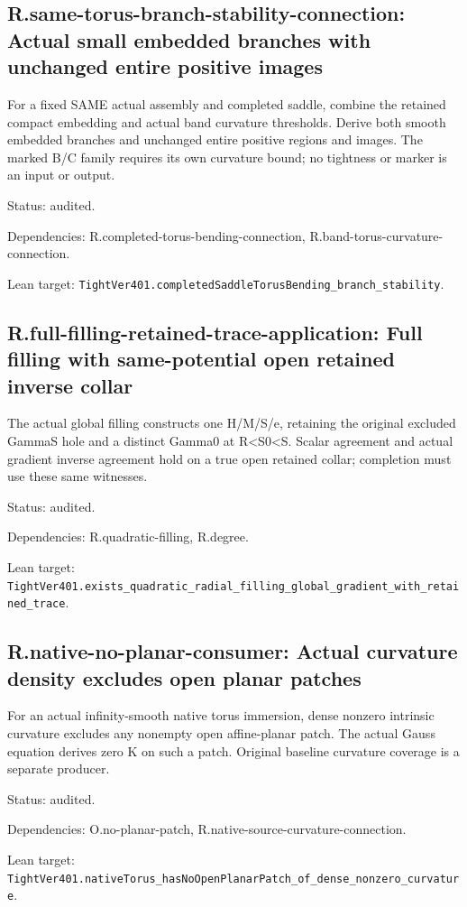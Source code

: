 \documentclass{article}
\begin{document}
\subsection*{R.same-torus-branch-stability-connection: Actual small embedded branches with unchanged entire positive images}
For a fixed SAME actual assembly and completed saddle, combine the retained compact embedding and actual band curvature thresholds. Derive both smooth embedded branches and unchanged entire positive regions and images. The marked B/C family requires its own curvature bound; no tightness or marker is an input or output.
\par Status: audited.
\par Dependencies: R.completed-torus-bending-connection, R.band-torus-curvature-connection.
\par Lean target: \texttt{TightVer401.completedSaddleTorusBending\_branch\_stability}.
\subsection*{R.full-filling-retained-trace-application: Full filling with same-potential open retained inverse collar}
The actual global filling constructs one H/M/S/e, retaining the original excluded GammaS hole and a distinct Gamma0 at R<S0<S. Scalar agreement and actual gradient inverse agreement hold on a true open retained collar; completion must use these same witnesses.
\par Status: audited.
\par Dependencies: R.quadratic-filling, R.degree.
\par Lean target: \texttt{TightVer401.exists\_quadratic\_radial\_filling\_global\_gradient\_with\_retained\_trace}.
\subsection*{R.native-no-planar-consumer: Actual curvature density excludes open planar patches}
For an actual infinity-smooth native torus immersion, dense nonzero intrinsic curvature excludes any nonempty open affine-planar patch. The actual Gauss equation derives zero K on such a patch. Original baseline curvature coverage is a separate producer.
\par Status: audited.
\par Dependencies: O.no-planar-patch, R.native-source-curvature-connection.
\par Lean target: \texttt{TightVer401.nativeTorus\_hasNoOpenPlanarPatch\_of\_dense\_nonzero\_curvature}.
\end{document}
